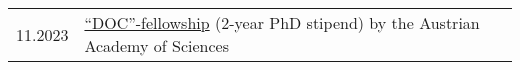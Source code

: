 
\begin{longtable}[l]{@{}p{} p{}}
    11.2023 & \href{https://stipendien.oeaw.ac.at/en/fellowships/doc}{“DOC”-fellowship} (2-year PhD stipend) by the Austrian Academy of Sciences\\

\end{longtable}
